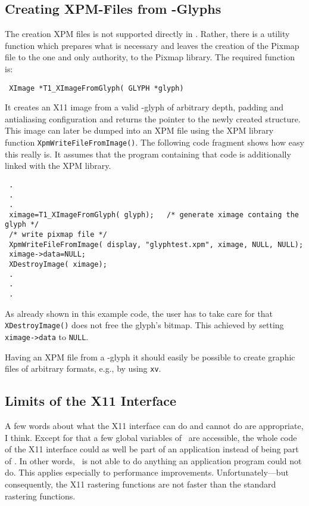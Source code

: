 \subsection{Creating XPM-Files from \tonelib-Glyphs}
\label{xpmfiles}
The creation XPM files is not supported directly in \tonelib. Rather, there is
a utility function which prepares what is necessary and leaves the creation of
the Pixmap file to the one and only authority, to the Pixmap library. The
required function is:
\precorr
\begin{verbatim}
 XImage *T1_XImageFromGlyph( GLYPH *glyph)
\end{verbatim}\postcorr
It creates an X11 image from a valid \tonelib-glyph of arbitrary depth,
padding and antialiasing configuration and returns the pointer to the newly
created structure. This image can later be dumped into an XPM file using the
XPM library function \verb+XpmWriteFileFromImage()+. The following code
fragment shows how easy this really is. It assumes that the program containing
that code is additionally linked with the XPM library.
\begin{verbatim}
 .
 .
 .
 ximage=T1_XImageFromGlyph( glyph);   /* generate ximage containg the glyph */
 /* write pixmap file */
 XpmWriteFileFromImage( display, "glyphtest.xpm", ximage, NULL, NULL); 
 ximage->data=NULL;
 XDestroyImage( ximage);
 .
 .
 .
\end{verbatim}
As already shown in this example code, the user has to take care for that
\verb+XDestroyImage()+ does not free the glyph's bitmap. This achieved by
setting \verb+ximage->data+ to \verb+NULL+.

Having an XPM file from a \tonelib-glyph it should easily be possible to
create graphic files of arbitrary formats, e.g., by using \verb+xv+.

\subsection{Limits of the X11 Interface}
A few words about what the X11 interface can do and cannot do are appropriate,
I think. Except for that a few global variables of \tonelib\ are accessible,
the whole code of the X11 interface could as well be part of an application
instead of being part of \tonelib. In other words, \tonelib\ is not able to do
anything an application program could not do. This applies especially to
performance improvements. Unfortunately---but consequently, the X11 rastering
functions are not faster than the standard rastering functions.

